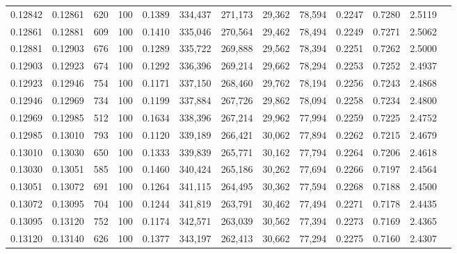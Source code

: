 \begin{tabular}{rrrrrrrrrrrrr}
0.12842 & 0.12861 &   620 & 100 &                                     0.1389 & 334,437 & 271,173 &  29,362 &  78,594 & 0.2247 & 0.7280 & 2.5119 \\
0.12861 & 0.12881 &   609 & 100 &                                     0.1410 & 335,046 & 270,564 &  29,462 &  78,494 & 0.2249 & 0.7271 & 2.5062 \\
0.12881 & 0.12903 &   676 & 100 &                                     0.1289 & 335,722 & 269,888 &  29,562 &  78,394 & 0.2251 & 0.7262 & 2.5000 \\
0.12903 & 0.12923 &   674 & 100 &                                     0.1292 & 336,396 & 269,214 &  29,662 &  78,294 & 0.2253 & 0.7252 & 2.4937 \\
0.12923 & 0.12946 &   754 & 100 &                                     0.1171 & 337,150 & 268,460 &  29,762 &  78,194 & 0.2256 & 0.7243 & 2.4868 \\
0.12946 & 0.12969 &   734 & 100 &                                     0.1199 & 337,884 & 267,726 &  29,862 &  78,094 & 0.2258 & 0.7234 & 2.4800 \\
0.12969 & 0.12985 &   512 & 100 &                                     0.1634 & 338,396 & 267,214 &  29,962 &  77,994 & 0.2259 & 0.7225 & 2.4752 \\
0.12985 & 0.13010 &   793 & 100 &                                     0.1120 & 339,189 & 266,421 &  30,062 &  77,894 & 0.2262 & 0.7215 & 2.4679 \\
0.13010 & 0.13030 &   650 & 100 &                                     0.1333 & 339,839 & 265,771 &  30,162 &  77,794 & 0.2264 & 0.7206 & 2.4618 \\
0.13030 & 0.13051 &   585 & 100 &                                     0.1460 & 340,424 & 265,186 &  30,262 &  77,694 & 0.2266 & 0.7197 & 2.4564 \\
0.13051 & 0.13072 &   691 & 100 &                                     0.1264 & 341,115 & 264,495 &  30,362 &  77,594 & 0.2268 & 0.7188 & 2.4500 \\
0.13072 & 0.13095 &   704 & 100 &                                     0.1244 & 341,819 & 263,791 &  30,462 &  77,494 & 0.2271 & 0.7178 & 2.4435 \\
0.13095 & 0.13120 &   752 & 100 &                                     0.1174 & 342,571 & 263,039 &  30,562 &  77,394 & 0.2273 & 0.7169 & 2.4365 \\
0.13120 & 0.13140 &   626 & 100 &                                     0.1377 & 343,197 & 262,413 &  30,662 &  77,294 & 0.2275 & 0.7160 & 2.4307 \\

\end{tabular}
